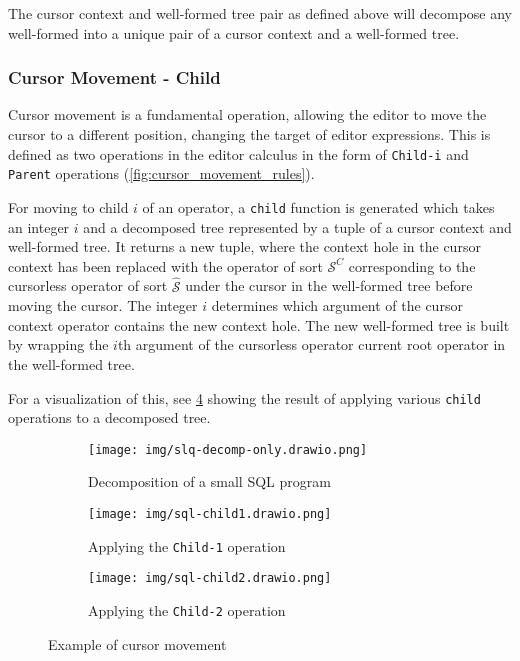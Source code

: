 \documentclass[sigplan,screen]{acmart}
\begin{document}
The cursor context and well-formed tree pair as defined above will decompose
any well-formed \abt into a unique pair of a cursor context and a well-formed tree.

\subsubsection{Cursor Movement - Child}
Cursor movement is a fundamental operation, allowing the editor to move the cursor
to a different position, changing the target of editor expressions. This is defined
as two operations in the editor calculus in the form of
\texttt{Child-i} and \texttt{Parent} operations (\cref{fig:cursor_movement_rules}).

For moving to child $i$ of an operator, a \texttt{child} function is generated
which takes an integer $i$ and a decomposed tree represented by a tuple of a cursor
context and well-formed tree. It returns a new tuple, where the context hole in
the cursor context has been replaced with the operator of sort $\mathcal{S}^C$ corresponding to the cursorless
operator of sort $\hat{\mathcal{S}}$ under the cursor in the well-formed tree before
moving the cursor. The integer $i$ determines which argument of the cursor context
operator contains the new context hole. The new well-formed tree is built by
wrapping the $i$th argument of the cursorless operator current root operator
in the well-formed tree.

For a visualization of this, see \cref{fig:movement-example} showing the result
of applying various \texttt{child} operations to a decomposed tree.

\begin{figure}[h]
  \centering
  \begin{subfigure}[b]{0.9\linewidth}
    \centering
    \texttt{[image: img/slq-decomp-only.drawio.png]}
    \caption{Decomposition of a small SQL program}
    \label{subfig:decomp-only}
  \end{subfigure}
  \hfill
  \begin{subfigure}[b]{0.9\linewidth}
    \centering
    \texttt{[image: img/sql-child1.drawio.png]}
    \caption{Applying the \texttt{Child-1} operation}
    \label{subfig:child1}
  \end{subfigure}
  \hfill
  \begin{subfigure}[b]{0.9\linewidth}
    \centering
    \texttt{[image: img/sql-child2.drawio.png]}
    \caption{Applying the \texttt{Child-2} operation}
    \label{subfig:child2}
  \end{subfigure}
  \caption{Example of cursor movement}
  \label{fig:movement-example}
\end{figure}
\end{document}
